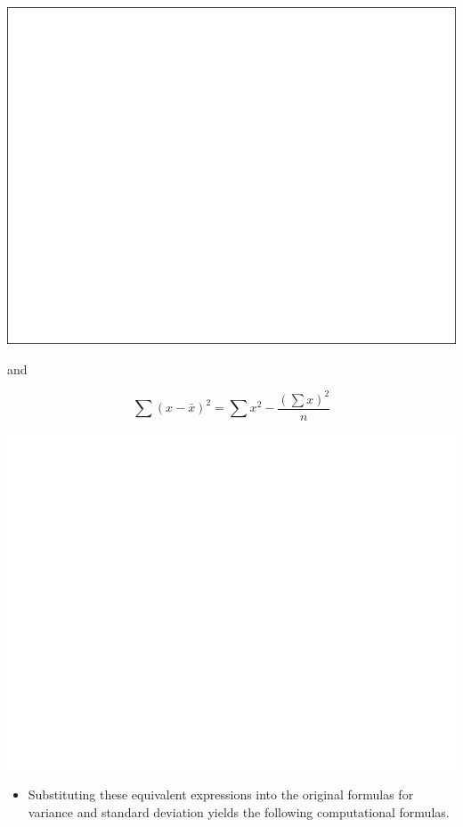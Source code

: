\documentclass[]{book}
\providecommand{\tightlist}{%
  \setlength{\itemsep}{0pt}\setlength{\parskip}{0pt}}
\begin{document}
\begin{center}\includegraphics[width=1\linewidth]{figure/variance1-1} \end{center}

and

\[\sum{(x-\bar{x})^2}= \sum{x^2}- \frac{(\sum x)^2}{n}\]

\begin{center}\includegraphics[width=1\linewidth]{figure/variance2-1} \end{center}

\begin{itemize}
\tightlist
\item
  Substituting these equivalent expressions into the original formulas for variance and standard deviation yields the following computational formulas.
\end{itemize}
\end{document}
